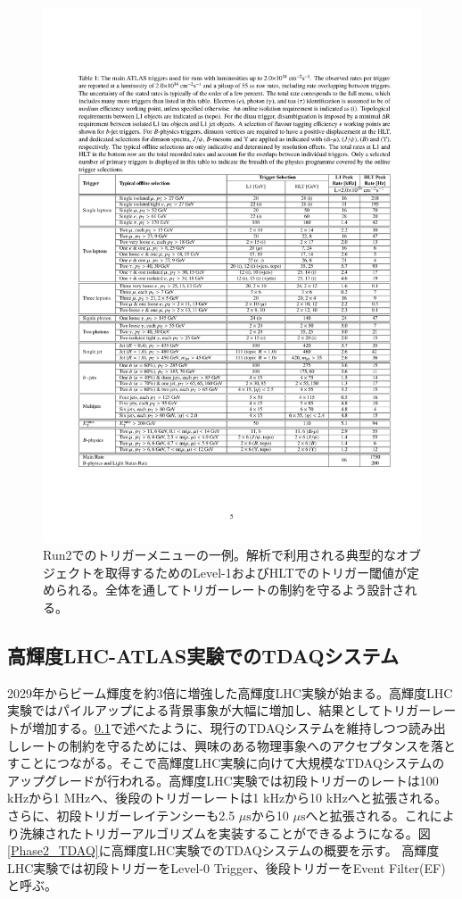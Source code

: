     \begin{figure} 
    \centering
    \includegraphics[width=16cm]{fig/Intro/Run2_Triggermenu.pdf}
    \caption[Run2でのトリガーメニューの一例]{Run2でのトリガーメニューの一例\cite{Run2_Triggermenu}。解析で利用される典型的なオブジェクトを取得するためのLevel-1およびHLTでのトリガー閾値が定められる。全体を通してトリガーレートの制約を守るよう設計される。}
    \label{Run2_Triggermenu}
    \end{figure}

    \subsection{高輝度LHC-ATLAS実験でのTDAQシステム}
2029年からビーム輝度を約3倍に増強した高輝度LHC実験が始まる。高輝度LHC実験ではパイルアップによる背景事象が大幅に増加し、結果としてトリガーレートが増加する。\ref{}で述べたように、現行のTDAQシステムを維持しつつ読み出しレートの制約を守るためには、興味のある物理事象へのアクセプタンスを落とすことにつながる。そこで高輝度LHC実験に向けて大規模なTDAQシステムのアップグレードが行われる。高輝度LHC実験では初段トリガーのレートは100 kHzから1 MHzへ、後段のトリガーレートは1 kHzから10 kHzへと拡張される。さらに、初段トリガーレイテンシーも2.5 $\mu\mathrm{s}$から10 $\mu\mathrm{s}$へと拡張される。これにより洗練されたトリガーアルゴリズムを実装することができるようになる。図\ref{Phase2_TDAQ}に高輝度LHC実験でのTDAQシステムの概要を示す。
高輝度LHC実験では初段トリガーをLevel-0 Trigger、後段トリガーをEvent Filter(EF)と呼ぶ。

